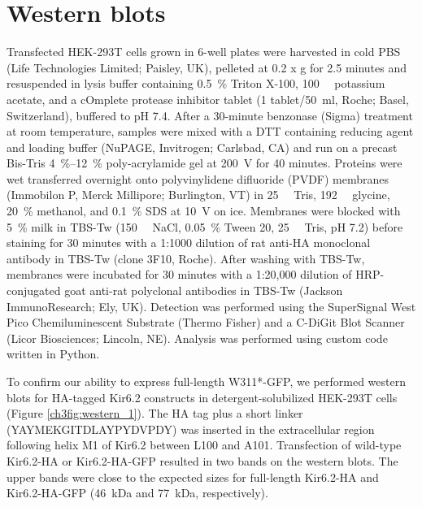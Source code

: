 \section{Western blots}
Transfected HEK-293T cells grown in 6-well plates were harvested in cold PBS (Life Technologies Limited; Paisley, UK), pelleted at 0.2 x g for 2.5 minutes and resuspended in lysis buffer containing \SI{0.5}{\percent} Triton X-100, \SI{100}{\milli\Molar} potassium acetate, and a cOmplete protease inhibitor tablet (1 tablet/\SI{50}{\milli\litre}, Roche; Basel, Switzerland), buffered to pH 7.4.
After a 30-minute benzonase (Sigma) treatment at room temperature, samples were mixed with a DTT containing reducing agent and loading buffer (NuPAGE, Invitrogen; Carlsbad, CA) and run on a precast Bis-Tris \SIrange{4}{12}{\percent} poly-acrylamide gel at \SI{200}{\volt} for 40 minutes.
Proteins were wet transferred overnight onto polyvinylidene difluoride (PVDF) membranes (Immobilon P, Merck Millipore; Burlington, VT) in \SI{25}{\milli\Molar} Tris, \SI{192}{\milli\Molar} glycine, \SI{20}{\percent} methanol, and \SI{0.1}{\percent} SDS at \SI{10}{\volt} on ice.
Membranes were blocked with \SI{5}{\percent} milk in TBS-Tw (\SI{150}{\milli\Molar} NaCl, \SI{0.05}{\percent} Tween 20, \SI{25}{\milli\Molar} Tris, pH 7.2) before staining for 30 minutes with a 1:1000 dilution of rat anti-HA monoclonal antibody in TBS-Tw (clone 3F10, Roche).
After washing with TBS-Tw, membranes were incubated for 30 minutes with a 1:20,000 dilution of HRP-conjugated goat anti-rat polyclonal antibodies in TBS-Tw (Jackson ImmunoResearch; Ely, UK).
Detection was performed using the SuperSignal West Pico Chemiluminescent Substrate (Thermo Fisher) and a C-DiGit Blot Scanner (Licor Biosciences; Lincoln, NE).
Analysis was performed using custom code written in Python.

To confirm our ability to express full-length W311*-GFP, we performed western blots for HA-tagged Kir6.2 constructs in detergent-solubilized HEK-293T cells (Figure \ref{ch3fig:western_1}).
The HA tag plus a short linker (YAYMEKGITDLAYPYDVPDY) was inserted in the extracellular region following helix M1 of Kir6.2 between L100 and A101.
Transfection of wild-type Kir6.2-HA or Kir6.2-HA-GFP resulted in two bands on the western blots.
The upper bands were close to the expected sizes for full-length Kir6.2-HA and Kir6.2-HA-GFP (\SI{46}{\kilo\dalton} and \SI{77}{\kilo\dalton}, respectively).

